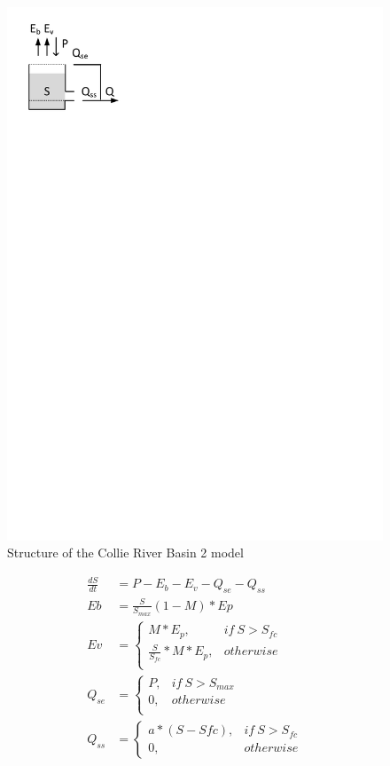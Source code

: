{ 																	%
\begin{figure}
\includegraphics[trim=1cm 24cm 9cm 1cm,keepaspectratio]{./files/03_schematic.pdf}
\caption{Structure of the Collie River Basin 2 model} \label{fig:03_schematic}
\end{figure}

\begin{align}
	\frac{dS}{dt} &= P -E_b - E_v -Q_{se}-Q_{ss} \\
	Eb &= \frac{S}{S_{max}}(1-M)*Ep\\
	Ev &= 
		\begin{cases}
			M*E_p, & if~S>S_{fc}\\
			\frac{S}{S_{fc}}*M*E_p, &otherwise\\
		\end{cases}\\
	Q_{se} &= 
		\begin{cases}
			P, & if~S>S_{max}\\
			0, & otherwise \\
		\end{cases}\\
	Q_{ss} &= 
		\begin{cases}
			a*(S-S{fc}), & if~S>S_{fc}\\
			0, & otherwise 
		\end{cases}
\end{align}
}
\vspace{0.5cm}

